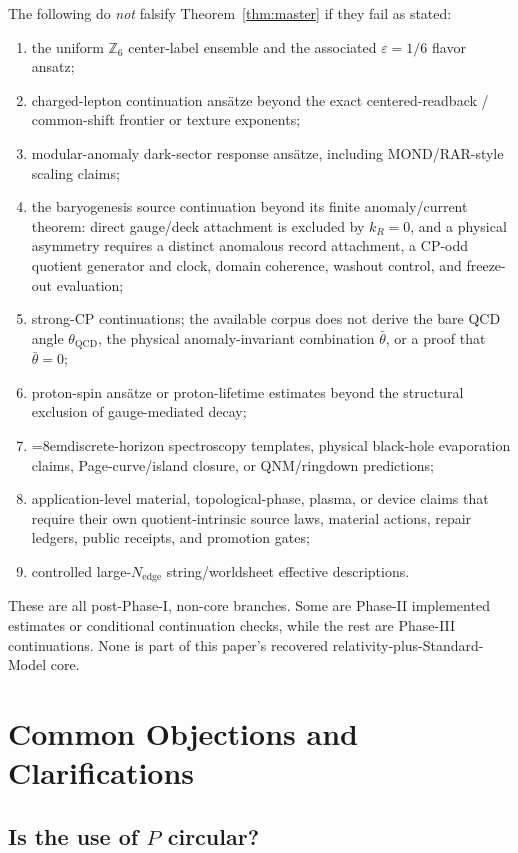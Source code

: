 \documentclass[11pt]{article}
\begin{document}
The following do \emph{not} falsify Theorem~\ref{thm:master} if they fail as stated:
\begin{enumerate}[leftmargin=2em]
\item the uniform $\mathbb Z_6$ center-label ensemble and the associated $\varepsilon=1/6$ flavor ansatz;
\item charged-lepton continuation ans\"atze beyond the exact centered-readback / common-shift frontier or texture exponents;
\item modular-anomaly dark-sector response ans\"atze, including MOND/RAR-style scaling claims;
\item the baryogenesis source continuation beyond its finite anomaly/current theorem: direct gauge/deck attachment is excluded by \(k_R=0\), and a physical asymmetry requires a distinct anomalous record attachment, a CP-odd quotient generator and clock, domain coherence, washout control, and freeze-out evaluation;
\item strong-CP continuations; the available corpus does not derive the bare QCD angle \(\theta_{\mathrm{QCD}}\), the physical anomaly-invariant combination \(\bar\theta\), or a proof that \(\bar\theta=0\);
\item proton-spin ans\"atze or proton-lifetime estimates beyond the structural exclusion of gauge-mediated decay;
\item {\emergencystretch=8em\relax discrete-horizon spectroscopy templates, physical black-hole evaporation claims, Page-curve/island closure, or QNM/ringdown predictions;\par}
\item application-level material, topological-phase, plasma, or device claims that require their own
quotient-intrinsic source laws, material actions, repair ledgers, public receipts, and promotion
gates;
\item controlled large-$N_{\mathrm{edge}}$ string/worldsheet effective descriptions.
\end{enumerate}
These are all post-Phase-I, non-core branches. Some are Phase-II implemented estimates or conditional continuation checks, while the rest are Phase-III continuations. None is part of this paper's recovered relativity-plus-Standard-Model core.

\section{Common Objections and Clarifications}

\subsection{\texorpdfstring{Is the use of $P$ circular?}{Is the use of P circular?}}
\end{document}

